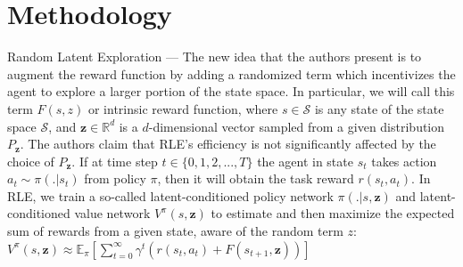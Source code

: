 \documentclass[10pt]{article} %
\begin{document}
\section{Methodology}
Random Latent Exploration --- The new idea that the authors \cite{rle-paper} present is to augment the reward function by adding a randomized term which incentivizes the agent to explore a larger portion of the state space. In particular, we will call this term $F(s, z)$ or intrinsic reward function, where $s \in \mathcal{S}$ is any state of the state space $\mathcal{S}$, and $\textbf{z} \in \mathbb{R}^{d}$ is a $d$-dimensional vector sampled from a given distribution $P_{\textbf{z}}$. The authors \cite{rle-paper} claim that \textsc{RLE}'s efficiency is not significantly affected by the choice of $P_{\textbf{z}}$. If at time step $t \in \{0, 1, 2, ..., T\}$ the agent in state $s_{t}$ takes action $a_{t} \sim \pi(. | s_{t})$ from policy $\pi$, then it will obtain the task reward $r (s_{t}, a_{t})$. In \textsc{RLE}, we train a so-called latent-conditioned policy network $\pi(. | s, \textbf{z})$ and latent-conditioned value network $V^{\pi}(s, \textbf{z})$ to estimate and then maximize the expected sum of rewards from a given state, aware of the random term $z$: $V^{\pi}(s, \textbf{z}) \approx \mathbb{E}_{\pi} \left[\sum_{t = 0}^{\infty} \gamma^{t} \left(r(s_{t}, a_{t}) + F(s_{t+1}, \textbf{z})\right) \right]$
\end{document}
